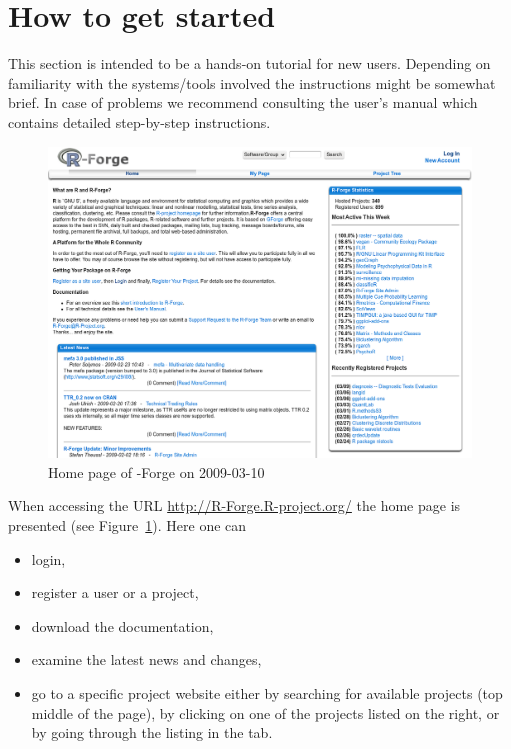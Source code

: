 \section{How to get started}
This section is intended to be a hands-on tutorial for new
users. Depending on familiarity with the systems/tools involved
the instructions might be somewhat brief. In case of problems we
recommend consulting the user's manual \citep{forge:usermanual:2008}
which contains detailed step-by-step instructions.

\begin{figure}[th]
\centering
\includegraphics{rforge_main_snapshot_modified.png}
\caption{Home page of \R{}-Forge on 2009-03-10}
\label{fig:home_page}
\end{figure}

When accessing the URL \url{http://R-Forge.R-project.org/} the home
page is presented (see Figure~\ref{fig:home_page}). Here one can

\begin{itemize}
\item login,
\item register a user or a project,
\item download the documentation,
\item examine the latest news and changes,
\item go to a specific project website either by searching for available
  projects (top middle of the page), by clicking on one of the projects
  listed on the right, or by going through the listing in
  the  tab.
\end{itemize}

